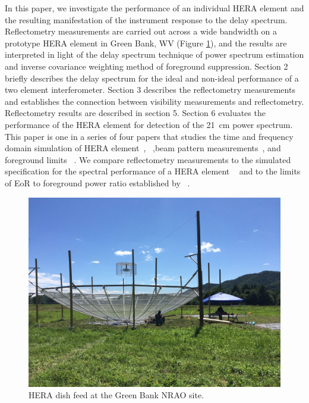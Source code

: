 \documentclass[twocolumn]{emulateapj}
\begin{document}
In this paper, we investigate the performance of an individual HERA element and the resulting manifestation of the instrument response to the delay spectrum. Reflectometry measurements  are carried out across a wide bandwidth on a prototype HERA element in Green Bank, WV (Figure \ref{fig:heradish}), and the results are interpreted in light of the delay spectrum technique of power spectrum estimation and inverse covariance weighting method of foreground suppression. Section 2 briefly describes the delay spectrum for the ideal and non-ideal performance of a two element interferometer. Section 3 describes the reflectometry measurements and establishes the connection between visibility measurements and reflectometry. Reflectometry results are described in section 5. Section 6 evaluates the performance of the HERA element for detection of the 21~cm power spectrum.
This paper is one in a series of four papers that studies the time and frequency domain simulation of  HERA element~\citep{Ewall-Wice_et_al2016}, ~\citep{ddboer_et_al2016},beam pattern measurements~\citep{Neben_et_al2016}, and foreground limits ~\citep{Thyagarajan_et_al2016}. We compare 
reflectometry measurements to the simulated specification for the spectral performance of a HERA element ~\citep{ddboer_et_al2016} and to the limits of EoR to foreground power ratio established by ~\citep{Thyagarajan_et_al2016}. 
\begin{figure}
\centering
\includegraphics[trim={2cm 20cm 30cm 15cm},clip, totalheight=0.3\textheight]{plots/heradish.jpg}
\caption{HERA dish feed at the Green Bank NRAO site.}
\label{fig:heradish}
\end{figure}
\end{document}
